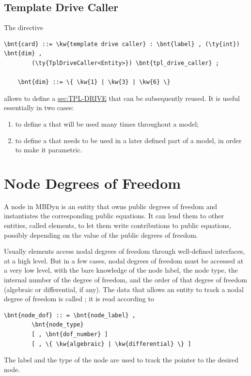 \subsection{Template Drive Caller}\label{sec:TPL-DRIVE-CALLER}
The  directive
\begin{Verbatim}[commandchars=\\\{\}]
    \bnt{card} ::= \kw{template drive caller} : \bnt{label} , (\ty{int}) \bnt{dim} ,
        (\ty{TplDriveCaller<Entity>}) \bnt{tpl_drive_caller} ;

    \bnt{dim} ::= \{ \kw{1} | \kw{3} | \kw{6} \}
\end{Verbatim}
allows to define
a \hyperref{\kw{template drive caller}}{\kw{template drive caller} (see Section~}{)}{sec:TPL-DRIVE}
that can be subsequently reused.
It is useful essentially in two cases:
\begin{enumerate}
	\renewcommand{\labelenumi}{\alph{enumi})}
	\item to define a 
	that will be used many times throughout a model;
	\item to define a  
	that needs to be used in a later defined part of a model, 
	in order to make it parametric.
\end{enumerate}






\section{Node Degrees of Freedom}\label{sec:NODEDOF}
A node in MBDyn is an entity that owns public degrees of freedom
and instantiates the corresponding public equations.
It can lend them to other entities, called elements, to let them write
contributions to public equations, possibly depending on the value
of the public degrees of freedom. 

Usually elements access nodal degrees of freedom through well-defined
interfaces, at a high level. 
But in a few cases, nodal degrees of freedom must be accessed
at a very low level, with the bare knowledge of the node label,
the node type, the internal number of the degree of freedom,
and the order of that degree of freedom (algebraic or differential, if any).
The data that allows an entity to track a nodal degree of freedom
is called ; it is read according to
\begin{Verbatim}[commandchars=\\\{\}]
    \bnt{node_dof} :: = \bnt{node_label} , 
        \bnt{node_type}
        [ , \bnt{dof_number} ]
        [ , \{ \kw{algebraic} | \kw{differential} \} ]
\end{Verbatim}
The label  and the type 
of the node are used to track the pointer to the desired node. 

